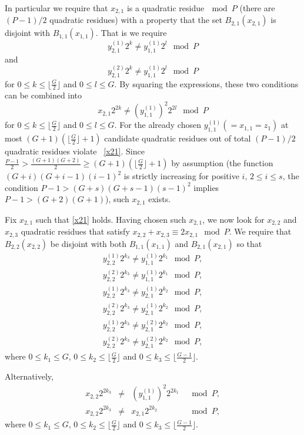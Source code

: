 In particular we require that $x_{2,1}$ is a quadratic
residue$~\mod P$ (there are $(P-1)/2$ quadratic residues) with a
property that the set $B_{2,1}(x_{2,1})$ is disjoint with
$B_{1,1}(x_{1,1})$. That is we require \[y_{2,1}^{(1)}2^k \neq
y_{1,1}^{(1)} 2^l \mod P \] and
\[y_{2,1}^{(2)}2^k \neq y_{1,1}^{(1)} 2^l \mod P \] for $0 \leq k \leq \lfloor
\frac{G}{2} \rfloor$ and $0 \leq l \leq G$. By squaring the
expressions, these two conditions can be combined into
\begin{equation}\label{x21}x_{2,1}2^{2k} \neq (y_{1,1}^{(1)})^2 2^{2l} \mod P \end{equation}for $0
\leq k \leq \lfloor \frac{G}{2} \rfloor$ and $0 \leq l \leq G$.
For the already chosen $y_{1,1}^{(1)}(=x_{1,1}=z_1)$ at most
$(G+1)(\lfloor \frac{G}{2} \rfloor+1)$ candidate quadratic
residues out of total $(P-1)/2$ quadratic residues violate
~\eqref{x21}. Since $\frac{P-1}{2} > \frac{(G+1)(G+2)}{2} \geq
(G+1)(\lfloor \frac{G}{2} \rfloor+1)$ by assumption (the function
$(G+i)(G+i-1)(i-1)^2$ is strictly increasing for positive $i$, $2
\leq i \leq s$, the condition $P-1> (G+s)(G+s-1)(s-1)^2$ implies
$P-1>(G+2)(G+1)$), such $x_{2,1}$ exists.

Fix $x_{2,1}$ such that \eqref{x21} holds. Having chosen such
$x_{2,1}$, we now look for $x_{2,2}$ and $x_{2,3}$ quadratic
residues that satisfy $x_{2,2}+x_{2,3} \equiv 2x_{2,1} \mod P$. We
require that $B_{2,2}(x_{2,2})$ be disjoint with both
$B_{1,1}(x_{1,1})$ and $B_{2,1}(x_{2,1})$ so that
\begin{eqnarray*}
y_{2,2}^{(1)}2^{k_3} \neq y_{1,1}^{(1)} 2^{k_1} \mod P, \\
y_{2,2}^{(2)}2^{k_3} \neq y_{1,1}^{(1)} 2^{k_1} \mod P,  \\
y_{2,2}^{(1)}2^{k_3} \neq y_{2,1}^{(1)} 2^{k_2} \mod P, \\
y_{2,2}^{(2)}2^{k_3} \neq y_{2,1}^{(1)} 2^{k_2} \mod P,  \\
y_{2,2}^{(1)}2^{k_3} \neq y_{2,1}^{(2)} 2^{k_2} \mod P, \\
y_{2,2}^{(2)}2^{k_3} \neq y_{2,1}^{(2)} 2^{k_2} \mod P,
\end{eqnarray*}
where $0 \leq k_1 \leq G$, $0 \leq k_2 \leq \lfloor \frac{G}{2}
\rfloor$ and $0 \leq k_3 \leq \lfloor\frac{G-1}{2} \rfloor$.

Alternatively,
\begin{equation}\label{eqx22}\begin{array}{cccc}
x_{2,2}2^{2k_3} &\neq& (y_{1,1}^{(1)})^2 2^{2k_1} &\mod P, \\
x_{2,2}2^{2k_3} &\neq& x_{2,1} 2^{2k_2} &\mod P,
\end{array}\end{equation}
where $0 \leq k_1 \leq G$, $0 \leq k_2 \leq \lfloor \frac{G}{2}
\rfloor$ and $0 \leq k_3 \leq \lfloor\frac{G-1}{2} \rfloor$.


